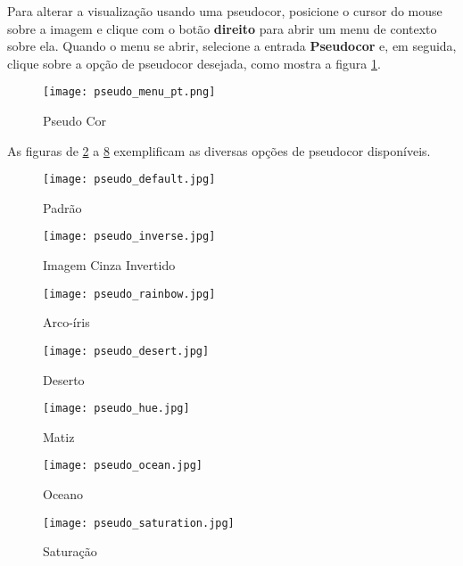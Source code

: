 Para alterar a visualização usando uma pseudocor, posicione o cursor do mouse sobre a imagem e clique
com o botão \textbf{direito} para abrir um menu de contexto sobre ela. Quando o menu se abrir,
selecione a entrada \textbf{Pseudocor} e, em seguida, clique sobre a opção de pseudocor desejada, como
mostra a figura \ref{fig:pseudo_color}.

\begin{figure}[H]
\centering
\texttt{[image: pseudo\_menu\_pt.png]}
\caption{Pseudo Cor}
\label{fig:pseudo_color}
\end{figure}

As figuras de \ref{fig:image_default} a \ref{fig:image_saturation} exemplificam as diversas opções de
pseudocor disponíveis.\\

\begin{figure}[H]
\centering
\texttt{[image: pseudo\_default.jpg]}
\caption{Padrão}
\label{fig:image_default}
\end{figure}

\begin{figure}[H]
\centering
\texttt{[image: pseudo\_inverse.jpg]}
\caption{Imagem Cinza Invertido}
\label{fig:image_inverted}
\end{figure}

\begin{figure}[H]
\centering
\texttt{[image: pseudo\_rainbow.jpg]}
\caption{Arco-íris}
\label{fig:image_arc}
\end{figure}

\begin{figure}[H]
\centering
\texttt{[image: pseudo\_desert.jpg]}
\caption{Deserto}
\label{fig:image_desert}
\end{figure}

\begin{figure}[H]
\centering
\texttt{[image: pseudo\_hue.jpg]}
\caption{Matiz}
\label{fig:image_matiz}
\end{figure}

\begin{figure}[H]
\centering
\texttt{[image: pseudo\_ocean.jpg]}
\caption{Oceano}
\label{fig:image_ocean}
\end{figure}

\begin{figure}[H]
\centering
\texttt{[image: pseudo\_saturation.jpg]}
\caption{Saturação}
\label{fig:image_saturation}
\end{figure}

